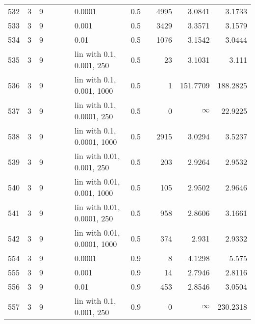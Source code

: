 \begin{longtable}{lrrrrrlrrrrr}
 532 &       3 & 9 &   &   &   &                      0.0001 &  0.5 &        &    4995 &                 3.0841 &                 3.1733 \\
 533 &       3 & 9 &   &   &   &                       0.001 &  0.5 &        &    3429 &                 3.3571 &                 3.1579 \\
 534 &       3 & 9 &   &   &   &                        0.01 &  0.5 &        &    1076 &                 3.1542 &                 3.0444 \\
 535 &       3 & 9 &   &   &   &    lin with 0.1, 0.001, 250 &  0.5 &        &      23 &                 3.1031 &                  3.111 \\
 536 &       3 & 9 &   &   &   &   lin with 0.1, 0.001, 1000 &  0.5 &        &       1 &               151.7709 &               188.2825 \\
 537 &       3 & 9 &   &   &   &   lin with 0.1, 0.0001, 250 &  0.5 &        &       0 &               $\infty$ &                22.9225 \\
 538 &       3 & 9 &   &   &   &  lin with 0.1, 0.0001, 1000 &  0.5 &        &    2915 &                 3.0294 &                 3.5237 \\
 539 &       3 & 9 &   &   &   &   lin with 0.01, 0.001, 250 &  0.5 &        &     203 &                 2.9264 &                 2.9532 \\
 540 &       3 & 9 &   &   &   &  lin with 0.01, 0.001, 1000 &  0.5 &        &     105 &                 2.9502 &                 2.9646 \\
 541 &       3 & 9 &   &   &   &  lin with 0.01, 0.0001, 250 &  0.5 &        &     958 &                 2.8606 &                 3.1661 \\
 542 &       3 & 9 &   &   &   & lin with 0.01, 0.0001, 1000 &  0.5 &        &     374 &                  2.931 &                 2.9332 \\
 554 &       3 & 9 &   &   &   &                      0.0001 &  0.9 &        &       8 &                 4.1298 &                  5.575 \\
 555 &       3 & 9 &   &   &   &                       0.001 &  0.9 &        &      14 &                 2.7946 &                 2.8116 \\
 556 &       3 & 9 &   &   &   &                        0.01 &  0.9 &        &     453 &                 2.8546 &                 3.0504 \\
 557 &       3 & 9 &   &   &   &    lin with 0.1, 0.001, 250 &  0.9 &        &       0 &               $\infty$ &               230.2318 \\

\end{longtable}
